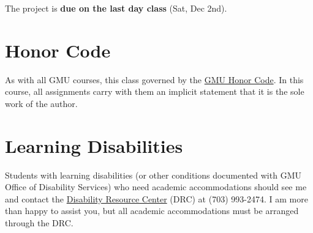 \documentclass[11pt]{article}
\begin{document}
The project is \textbf{due on the last day class} (Sat, Dec 2nd).

\section{Honor Code}
\label{sec:orgf24f4c5}

As with all GMU courses, this class governed by the \href{http://oai.gmu.edu/the-mason-honor-code/}{GMU Honor Code}. In this course, all assignments carry with them an implicit statement that it is the sole work of the author.

\section{Learning Disabilities}
\label{sec:org28deb33}

Students with learning disabilities (or other conditions documented with GMU Office of Disability Services) who need academic accommodations should see me and contact the \href{http://ods.gmu.edu/}{Disability Resource Center} (DRC) at (703) 993-2474. I am more than happy to assist you, but all academic accommodations must be arranged through the DRC.



\end{document}
